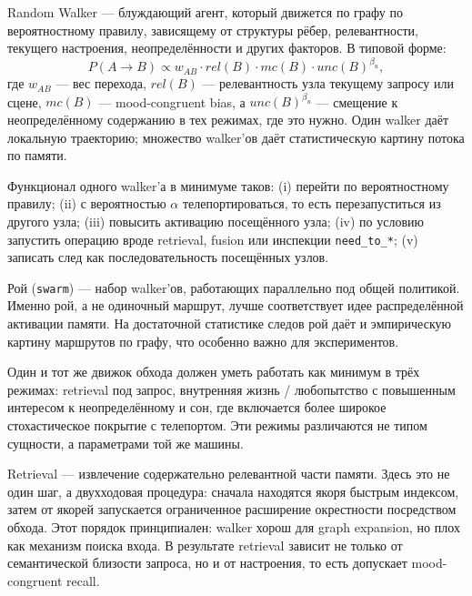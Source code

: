 \begin{definition}
Random Walker --- блуждающий агент, который движется по графу по
вероятностному правилу, зависящему от структуры рёбер, релевантности,
текущего настроения, неопределённости и других факторов. В типовой форме:
\[
P(A \to B) \propto w_{AB} \cdot rel(B) \cdot mc(B) \cdot unc(B)^{\beta_u},
\]
где $w_{AB}$ --- вес перехода, $rel(B)$ --- релевантность узла текущему
запросу или сцене, $mc(B)$ --- mood-congruent bias, а $unc(B)^{\beta_u}$ ---
смещение к неопределённому содержанию в тех режимах, где это нужно. Один
walker даёт локальную траекторию; множество walker'ов даёт статистическую
картину потока по памяти.
\end{definition}

Функционал одного walker'а в минимуме таков: (i) перейти по вероятностному
правилу; (ii) с вероятностью $\alpha$ телепортироваться, то есть
перезапуститься из другого узла; (iii) повысить активацию посещённого узла;
(iv) по условию запустить операцию вроде retrieval, fusion или инспекции
\texttt{need\_to\_*}; (v) записать след как последовательность посещённых узлов.

\begin{definition}
Рой (\texttt{swarm}) --- набор walker'ов, работающих параллельно под общей
политикой. Именно рой, а не одиночный маршрут, лучше соответствует идее
распределённой активации памяти. На достаточной статистике следов рой даёт и
эмпирическую картину маршрутов по графу, что особенно важно для
экспериментов.
\end{definition}

\begin{definition}
Один и тот же движок обхода должен уметь работать как минимум в трёх режимах:
retrieval под запрос, внутренняя жизнь / любопытство с повышенным интересом к
неопределённому и сон, где включается более широкое стохастическое покрытие с
телепортом. Эти режимы различаются не типом сущности, а параметрами той же
машины.
\end{definition}

\begin{definition}[Retrieval]
Retrieval --- извлечение содержательно релевантной части памяти. Здесь это не
один шаг, а двухходовая процедура: сначала находятся якоря быстрым индексом,
затем от якорей запускается ограниченное расширение окрестности посредством
обхода. Этот порядок принципиален: walker хорош для graph expansion, но плох
как механизм поиска входа. В результате retrieval зависит не только от
семантической близости запроса, но и от настроения, то есть допускает
mood-congruent recall.
\end{definition}

